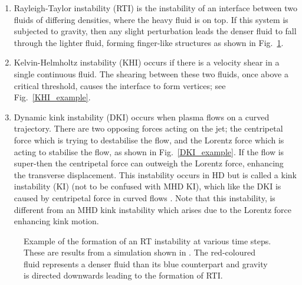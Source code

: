 \begin{enumerate}
    \item Rayleigh-Taylor instability (RTI) is the instability of an interface between two fluids of differing densities, where the heavy fluid is on top. If this system is subjected to gravity, then any slight perturbation leads the denser fluid to fall through the lighter fluid, forming finger-like structures as shown in Fig.~\ref{RT_example}.
    \item Kelvin-Helmholtz instability (KHI) occurs if there is a velocity shear in a single continuous fluid. The shearing between these two fluids, once above a critical threshold, causes the interface to form vertices; see Fig.~\ref{KHI_example}.    
    \item Dynamic kink instability (DKI) occurs when plasma flows on a curved trajectory. There are two opposing forces acting on the jet; the centripetal force which is trying to destabilise the flow, and the Lorentz force which is acting to stabilise the flow, as shown in Fig.~\ref{DKI_example}. If the flow is super-\Alfvenic then the centripetal force can outweigh the Lorentz force, enhancing the transverse displacement. This instability occurs in HD but is called a kink instability (KI) (not to be confused with MHD KI), which like the DKI is caused by centripetal force in curved flows \citep{Drazin2002ihsbookD}. Note that this instability, is different from an MHD kink instability which arises due to the Lorentz force enhancing kink motion.
\end{enumerate}
\begin{figure}
\captionsetup[subfigure]{labelformat=empty}
\centering
{}
\caption{Example of the formation of an RT instability at various time steps. These are results from a simulation shown in \cite{Liang2019PhFl31k2104L}. The red-coloured fluid represents a denser fluid than its blue counterpart and gravity is directed downwards leading to the formation of RTI.}
\label{RT_example}
\end{figure}
